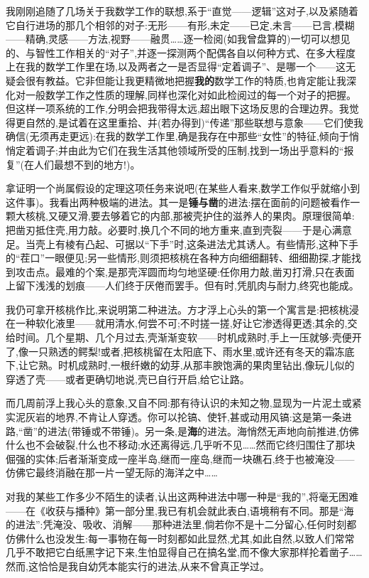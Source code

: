 \asterisms

我刚刚追随了几场关于我数学工作的联想,系于“直觉——逻辑”这对子,以及紧随着它自行进场的那几个相邻的对子:无形——有形,未定——已定,未言——已言,模糊——精确,灵感——方法,视野——融贯……逐一检阅(如我曾盘算的)一切可以想见的、与智性工作相关的“对子”,并逐一探测两个配偶各自以何种方式、在多大程度上在我的数学工作里在场,以及两者之一是否显得“定着调子”、是哪一个——这无疑会很有教益。它非但能让我更精微地把握\textbf{我的}数学工作的特质,也肯定能让我深化对一般数学工作之性质的理解,同样也深化对如此检阅过的每一个对子的把握。但这样一项系统的工作,分明会把我带得太远,超出眼下这场反思的合理边界。我觉得更自然的,是试着在这里重拾、并(若办得到)“传递”那些联想与意象——它们使我确信(无须再走更远):在我的数学工作里,确是我存在中那些“女性”的特征,倾向于悄悄定着调子;并由此为它们在我生活其他领域所受的压制,找到一场出乎意料的“报复”(在人们最想不到的地方!)。

拿证明一个尚属假设的定理这项任务来说吧(在某些人看来,数学工作似乎就缩小到这件事)。我看出两种极端的进法。其一是\textbf{锤与凿}的进法:摆在面前的问题被看作一颗大核桃,又硬又滑,要去够着它的内部,那被壳护住的滋养人的果肉。原理很简单:把凿刃抵住壳,用力敲。必要时,换几个不同的地方重来,直到壳裂——于是心满意足。当壳上有棱有凸起、可据以“下手”时,这条进法尤其诱人。有些情形,这种下手的“茬口”一眼便见;另一些情形,则须把核桃在各种方向细细翻转、细细勘探,才能找到攻击点。最难的个案,是那壳浑圆而均匀地坚硬:任你用力敲,凿刃打滑,只在表面上留下浅浅的划痕——人们终于厌倦而罢手。但有时,凭肌肉与耐力,终究也能成。

我仍可拿开核桃作比,来说明第二种进法。方才浮上心头的第一个寓言是:把核桃浸在一种软化液里——就用清水,何尝不可;不时搓一搓,好让它渗透得更透;其余的,交给时间。几个星期、几个月过去,壳渐渐变软——时机成熟时,手上一压就够:壳便开了,像一只熟透的鳄梨!或者,把核桃留在太阳底下、雨水里,或许还有冬天的霜冻底下,让它熟。时机成熟时,一根纤嫩的幼芽,从那丰腴饱满的果肉里钻出,像玩儿似的穿透了壳——或者更确切地说,壳已自行开启,给它让路。

而几周前浮上我心头的意象,又自不同:那有待认识的未知之物,显现为一片泥土或紧实泥灰岩的地界,不肯让人穿透。你可以抡镐、使钎,甚或动用风镐:这是第一条进路,“凿”的进法(带锤或不带锤)。另一条,是\textbf{海}的进法。海悄然无声地向前推进,仿佛什么也不会破裂,什么也不移动;水还离得远,几乎听不见……然而它终归围住了那块倔强的实体;后者渐渐变成一座半岛,继而一座岛,继而一块礁石,终于也被淹没——仿佛它最终消融在那一片一望无际的海洋之中……

对我的某些工作多少不陌生的读者,认出这两种进法中哪一种是“我的”,将毫无困难——在《收获与播种》第一部分里,我已有机会就此表白,语境稍有不同。那是“海的进法”:凭淹没、吸收、消解——那种进法里,倘若你不是十二分留心,任何时刻都仿佛什么也没发生:每一事物在每一时刻都如此显然,尤其,如此自然,以致人们常常几乎不敢把它白纸黑字记下来,生怕显得自己在搞名堂,而不像大家那样抡着凿子……然而,这恰恰是我自幼凭本能实行的进法,从来不曾真正学过。

